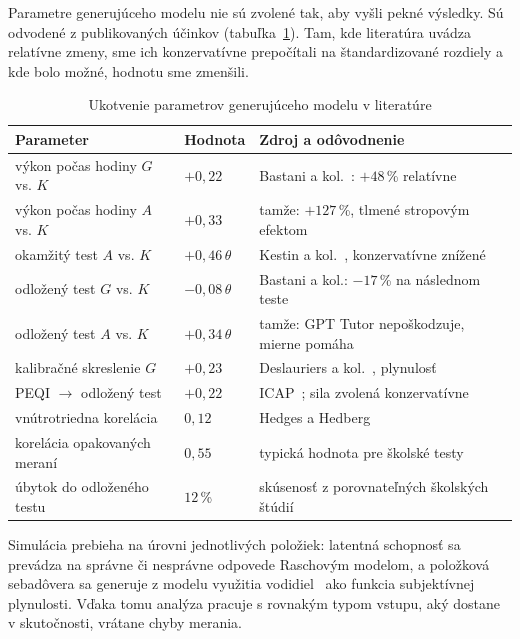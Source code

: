 Parametre generujúceho modelu nie sú zvolené tak, aby vyšli pekné výsledky. Sú odvodené z publikovaných účinkov (tabuľka~\ref{tab:kotvy}). Tam, kde literatúra uvádza relatívne zmeny, sme ich konzervatívne prepočítali na štandardizované rozdiely a kde bolo možné, hodnotu sme zmenšili.

\begin{table}[H]
\centering
\caption{Ukotvenie parametrov generujúceho modelu v literatúre}
\label{tab:kotvy}
\small
\begin{tabularx}{\textwidth}{@{}l l X@{}}
\toprule
\textbf{Parameter} & \textbf{Hodnota} & \textbf{Zdroj a odôvodnenie} \\
\midrule
výkon počas hodiny $G$ vs. $K$ & $+0{,}22$ & Bastani a kol.~\cite{bastani2025harm}: $+48$\,\% relatívne \\
výkon počas hodiny $A$ vs. $K$ & $+0{,}33$ & tamže: $+127$\,\%, tlmené stropovým efektom \\
okamžitý test $A$ vs. $K$ & $+0{,}46\,\theta$ & Kestin a kol.~\cite{kestin2025aitutoring}, konzervatívne znížené \\
odložený test $G$ vs. $K$ & $-0{,}08\,\theta$ & Bastani a kol.: $-17$\,\% na následnom teste \\
odložený test $A$ vs. $K$ & $+0{,}34\,\theta$ & tamže: GPT Tutor nepoškodzuje, mierne pomáha \\
kalibračné skreslenie $G$ & $+0{,}23$ & Deslauriers a kol.~\cite{deslauriers2019feeling}, plynulosť \\
PEQI $\to$ odložený test & $+0{,}22$ & ICAP~\cite{chi2014icap}; sila zvolená konzervatívne \\
vnútrotriedna korelácia & $0{,}12$ & Hedges a Hedberg~\cite{hedges2007icc} \\
korelácia opakovaných meraní & $0{,}55$ & typická hodnota pre školské testy \\
úbytok do odloženého testu & $12$\,\% & skúsenosť z porovnateľných školských štúdií \\
\bottomrule
\end{tabularx}
\end{table}

Simulácia prebieha na úrovni jednotlivých položiek: latentná schopnosť sa prevádza na správne či nesprávne odpovede Raschovým modelom, a položková sebadôvera sa generuje z modelu využitia vodidiel~\cite{koriat1997monitoring} ako funkcia subjektívnej plynulosti. Vďaka tomu analýza pracuje s rovnakým typom vstupu, aký dostane v skutočnosti, vrátane chyby merania.

